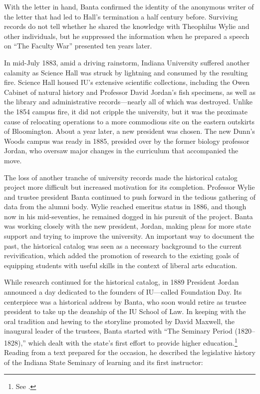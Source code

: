 \documentclass[
  american,
  letterpaper,
]{scrreprt}
\begin{document}
With the letter in hand, Banta confirmed the identity of the anonymous
writer of the letter that had led to Hall's termination a half century
before. Surviving records do not tell whether he shared the knowledge
with Theophilus Wylie and other individuals, but he suppressed the
information when he prepared a speech on ``The Faculty War'' presented
ten years later.

In mid-July 1883, amid a driving rainstorm, Indiana University suffered
another calamity as Science Hall was struck by lightning and consumed by
the resulting fire. Science Hall housed IU's extensive scientific
collections, including the Owen Cabinet of natural history and Professor
David Jordan's fish specimens, as well as the library and administrative
records---nearly all of which was destroyed. Unlike the 1854 campus
fire, it did not cripple the university, but it was the proximate cause
of relocating operations to a more commodious site on the eastern
outskirts of Bloomington. About a year later, a new president was
chosen. The new Dunn's Woods campus was ready in 1885, presided over by
the former biology professor Jordan, who oversaw major changes in the
curriculum that accompanied the move.

The loss of another tranche of university records made the historical
catalog project more difficult but increased motivation for its
completion. Professor Wylie and trustee president Banta continued to
push forward in the tedious gathering of data from the alumni body.
Wylie reached emeritus status in 1886, and though now in his
mid-seventies, he remained dogged in his pursuit of the project. Banta
was working closely with the new president, Jordan, making pleas for
more state support and trying to improve the university. An important
way to document the past, the historical catalog was seen as a necessary
background to the current revivification, which added the promotion of
research to the existing goals of equipping students with useful skills
in the context of liberal arts education.

While research continued for the historical catalog, in 1889 President
Jordan announced a day dedicated to the founders of IU---called
Foundation Day. Its centerpiece was a historical address by Banta, who
soon would retire as trustee president to take up the deanship of the IU
School of Law. In keeping with the oral tradition and hewing to the
storyline promoted by David Maxwell, the inaugural leader of the
trustees, Banta started with ``The Seminary Period (1820--1828),'' which
dealt with the state's first effort to provide higher
education.\footnote{See .} Reading from a text prepared for the
occasion, he described the legislative history of the Indiana State
Seminary of learning and its first instructor:
\end{document}
